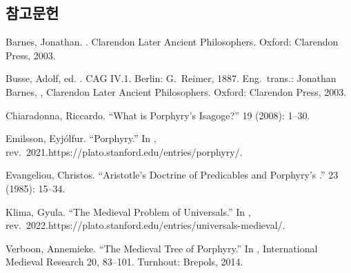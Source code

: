 \documentclass[12pt, a4paper]{article}
\begin{document}
\subsection*{참고문헌}
\begin{references}

 Barnes, Jonathan. . Clarendon Later Ancient Philosophers. Oxford: Clarendon Press, 2003.

 Busse, Adolf, ed. . CAG IV.1. Berlin: G.\ Reimer, 1887. Eng.\ trans.: Jonathan Barnes, , Clarendon Later Ancient Philosophers. Oxford: Clarendon Press, 2003.

 Chiaradonna, Riccardo. ``What is Porphyry's Isagoge?''  19 (2008): 1--30.

 Emilsson, Eyjólfur. ``Porphyry.'' In , rev.\ 2021.\newline https://plato.stanford.edu/entries/porphyry/.

 Evangeliou, Christos. ``Aristotle's Doctrine of Predicables and Porphyry's .''  23 (1985): 15--34.

 Klima, Gyula. ``The Medieval Problem of Universals.'' In , rev.\ 2022.\newline https://plato.stanford.edu/entries/universals-medieval/.

 Verboon, Annemieke. ``The Medieval Tree of Porphyry.'' In , International Medieval Research 20, 83--101. Turnhout: Brepols, 2014.

\end{references}
\end{document}
